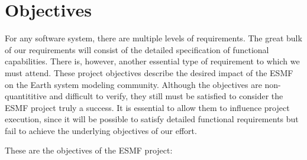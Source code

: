 \section{Objectives}

For any software system, there are multiple levels of requirements.
The great bulk of our requirements will consist of the detailed
specification of functional capabilities.  There is, however,
another essential type of requirement to which we must attend.  
These project objectives describe the desired impact of the
ESMF on the Earth system modeling community.  Although the objectives 
are non-quantititive and difficult to verify, they still must be 
satisfied to consider the ESMF project truly a success.  It
is essential to allow them to influence project execution, since
it will be possible to satisfy detailed functional
requirements but fail to achieve the underlying objectives of 
our effort.

\newpage
These are the objectives of the ESMF project:

